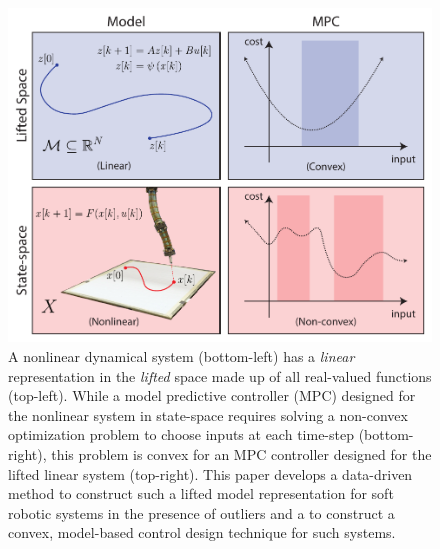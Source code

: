\begin{figure}
    \centering
    \includegraphics[width=\linewidth]{figures/overview_v8.pdf}
    \caption{A nonlinear dynamical system (bottom-left) has a \emph{linear} representation in the \emph{lifted} space made up of all real-valued functions (top-left). While a model predictive controller (MPC) designed for the nonlinear system in state-space requires solving a non-convex optimization problem to choose inputs at each time-step (bottom-right), this problem is convex for an MPC controller designed for the lifted linear system (top-right). This paper develops a data-driven method to construct such a lifted model representation for soft robotic systems in the presence of outliers and a to construct a convex, model-based control design technique for such systems. }
    \vspace*{-0.5cm}
    \label{fig:overview}
\end{figure}


